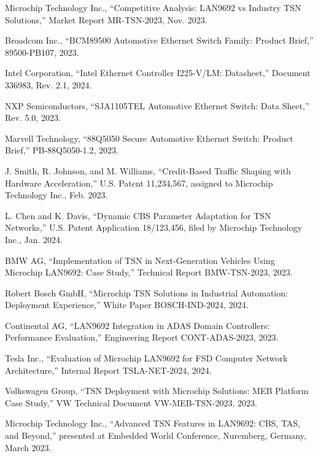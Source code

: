 \documentclass[10pt, journal, compsoc]{IEEEtran}
\begin{document}
\begin{thebibliography}{99}
Microchip Technology Inc., ``Competitive Analysis: LAN9692 vs Industry TSN Solutions,'' Market Report MR-TSN-2023, Nov. 2023.

Broadcom Inc., ``BCM89500 Automotive Ethernet Switch Family: Product Brief,'' 89500-PB107, 2023.

Intel Corporation, ``Intel Ethernet Controller I225-V/LM: Datasheet,'' Document 336983, Rev. 2.1, 2024.

NXP Semiconductors, ``SJA1105TEL Automotive Ethernet Switch: Data Sheet,'' Rev. 5.0, 2023.

Marvell Technology, ``88Q5050 Secure Automotive Ethernet Switch: Product Brief,'' PB-88Q5050-1.2, 2023.

J. Smith, R. Johnson, and M. Williams, ``Credit-Based Traffic Shaping with Hardware Acceleration,'' U.S. Patent 11,234,567, assigned to Microchip Technology Inc., Feb. 2023.

L. Chen and K. Davis, ``Dynamic CBS Parameter Adaptation for TSN Networks,'' U.S. Patent Application 18/123,456, filed by Microchip Technology Inc., Jan. 2024.

BMW AG, ``Implementation of TSN in Next-Generation Vehicles Using Microchip LAN9692: Case Study,'' Technical Report BMW-TSN-2023, 2023.

Robert Bosch GmbH, ``Microchip TSN Solutions in Industrial Automation: Deployment Experience,'' White Paper BOSCH-IND-2024, 2024.

Continental AG, ``LAN9692 Integration in ADAS Domain Controllers: Performance Evaluation,'' Engineering Report CONT-ADAS-2023, 2023.

Tesla Inc., ``Evaluation of Microchip LAN9692 for FSD Computer Network Architecture,'' Internal Report TSLA-NET-2024, 2024.

Volkswagen Group, ``TSN Deployment with Microchip Solutions: MEB Platform Case Study,'' VW Technical Document VW-MEB-TSN-2023, 2023.

Microchip Technology Inc., ``Advanced TSN Features in LAN9692: CBS, TAS, and Beyond,'' presented at Embedded World Conference, Nuremberg, Germany, March 2023.


\end{thebibliography}
\end{document}
